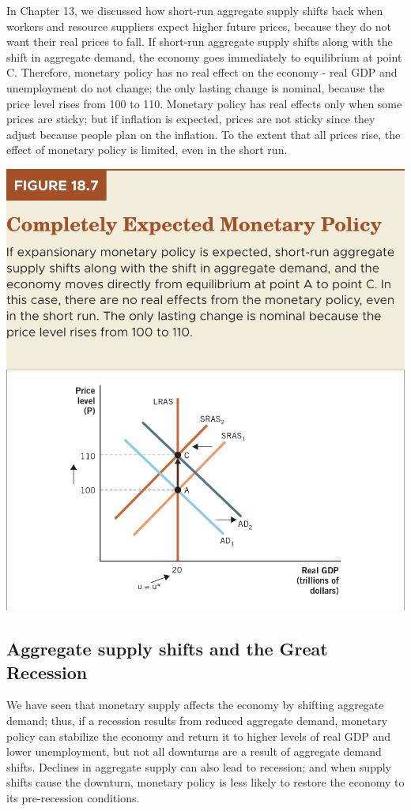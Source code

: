\documentclass[11pt]{article} %
\begin{document}
In Chapter 13, we discussed how short-run aggregate supply shifts back when workers and resource suppliers expect higher future prices, because they do not want their real prices to fall. If short-run aggregate supply shifts along with the shift in aggregate demand, the economy goes immediately to equilibrium at point C. Therefore, monetary policy has no real effect on the economy - real GDP and unemployment do not change; the only lasting change is nominal, because the price level rises from 100 to 110. Monetary policy has real effects only when some prices are sticky; but if inflation is expected, prices are not sticky since they adjust because people plan on the inflation. To the extent that all prices rise, the effect of monetary policy is limited, even in the short run.

\begin{center}
\includegraphics[scale=0.5]{images/Figure 18.7.png} 
\end{center}

\subsection*{Aggregate supply shifts and the Great Recession}
We have seen that monetary supply affects the economy by shifting aggregate demand; thus, if a recession results from reduced aggregate demand, monetary policy can stabilize the economy and return it to higher levels of real GDP and lower unemployment, but not all downturns are a result of aggregate demand shifts. Declines in aggregate supply can also lead to recession; and when supply shifts cause the downturn, monetary policy is less likely to restore the economy to its pre-recession conditions.
\end{document}

